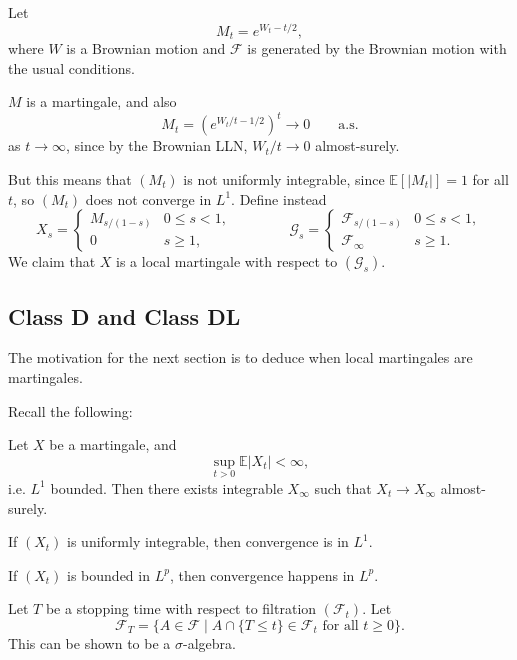 \documentclass[12pt]{article}
\begin{document}
\begin{exbox}
	Let
	\[
	M_t = e^{W_t - t/2},
	\]
	where $W$ is a Brownian motion and $\mathcal{F}$ is generated by the Brownian motion with the usual conditions.

	$M$ is a martingale, and also
	\[
		M_t = (e^{W_t/t - 1/2})^{t} \to 0 \qquad \text{a.s.}
	\]
	as $t \to \infty$, since by the Brownian LLN, $W_t/t \to 0$ almost-surely.

	But this means that $(M_t)$ is not uniformly integrable, since $\mathbb{E}[|M_t|] = 1$ for all $t$, so $(M_t)$ does not converge in $L^1$. Define instead
	\[
	X_s =
	\begin{cases}
		M_{s/(1-s)} & 0 \leq s < 1, \\
		0 & s\geq 1,
	\end{cases}
	\qquad \qquad
	\mathcal{G}_s =
	\begin{cases}
		\mathcal{F}_{s/(1-s)} & 0 \leq s < 1, \\
		\mathcal{F}_\infty & s \geq 1.
	\end{cases}
	\]
	We claim that $X$ is a local martingale with respect to $(\mathcal{G}_s)$.
\end{exbox}


\subsection{Class D and Class DL}%
\label{sub:cddl}

The motivation for the next section is to deduce when local martingales are martingales.

Recall the following:
\begin{theorem}
	Let $X$ be a martingale, and
	\[
	\sup_{t > 0} \mathbb{E}|X_t| < \infty,
	\]
	i.e. $L^1$ bounded. Then there exists integrable $X_\infty$ such that $X_t \to X_\infty$ almost-surely.

	If $(X_t)$ is uniformly integrable, then convergence is in $L^1$.

	If $(X_t)$ is bounded in $L^p$, then convergence happens in $L^p$.
\end{theorem}

\begin{definition}
	Let $T$ be a stopping time with respect to filtration $(\mathcal{F}_t)$. Let
	\[
		\mathcal{F}_T = \{A \in \mathcal{F} \mid A \cap \{T \leq t\} \in \mathcal{F}_t \text{ for all } t \geq 0\}.
	\]
	This can be shown to be a $\sigma$-algebra.
\end{definition}
\end{document}
